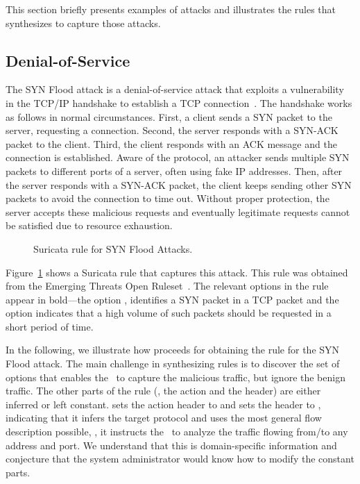 \documentclass[runningheads]{llncs}
\begin{document}
This section briefly presents examples of attacks and illustrates the
rules that \tname{} synthesizes to capture those attacks.


\subsection{Denial-of-Service}

The SYN Flood attack is a denial-of-service attack that exploits a vulnerability in the TCP/IP handshake
to establish a TCP connection~\cite{cloudfare-synflood}. The handshake
works as follows in normal circumstances. First, a client sends a SYN
packet to the server, requesting a connection. Second, the server
responds with a SYN-ACK packet to the client. Third, the client
responds with an ACK message and the connection is established. Aware
of the protocol, an attacker sends multiple SYN packets to different
ports of a server, often using fake IP addresses. Then, after the
server responds with a SYN-ACK packet, the client keeps sending other
SYN packets to avoid the connection to time out. Without proper
protection, the server accepts these malicious requests and eventually
legitimate requests cannot be satisfied due to resource exhaustion.

\begin{figure}[h!]
  
  \caption{Suricata rule for SYN Flood Attacks.}
  \label{fig:synflood-example}
\end{figure}


Figure~\ref{fig:synflood-example} shows a Suricata rule that captures
this attack. This rule was obtained from the Emerging Threats Open
Ruleset~\cite{emerging-threats-open}. The relevant options in the
rule appear in bold---the option , identifies a
SYN packet in a TCP packet and the option  indicates that a high
volume of such packets should be requested in a short period of time.




In the following, we illustrate how \tname{} proceeds for obtaining
the rule for the SYN Flood attack. The main challenge in synthesizing
rules is to discover the set of options that enables the \nids\ to
capture the malicious traffic, but ignore the benign traffic.  The
other parts of the rule (\ie{}, the action and the header) are either
inferred or left constant. \tname{} sets the action header to
 and sets the header to , indicating that it infers the target protocol and uses the
most general flow description possible, \ie{}, it instructs the
\nids\ to analyze the traffic flowing from/to any address and port.
We understand that this is domain-specific information and conjecture
that the system administrator would know how to modify the constant
parts.
\end{document}
